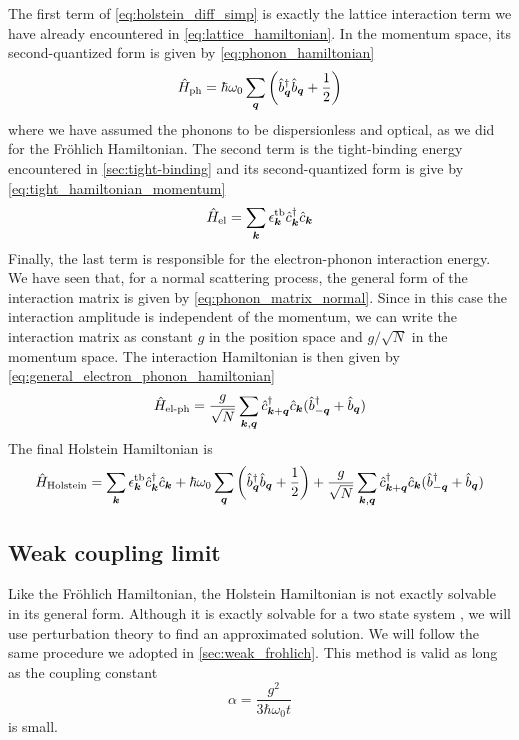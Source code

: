 The first term of \cref{eq:holstein_diff_simp} is exactly the lattice interaction term we have already encountered in \cref{eq:lattice_hamiltonian}. In the momentum space, its second-quantized form is given by \cref{eq:phonon_hamiltonian}
\begin{equation}
    \hat{H}_\text{ph} = \hbar \omega_0\sum_{\mathbf{\boldsymbol{q}}}  \left( \hat{b}^\dagger_{\mathbf{\boldsymbol{q}}} \hat{b}_{\mathbf{\boldsymbol{q}}} + \frac{1}{2} \right)
\end{equation}
where we have assumed the phonons to be dispersionless and optical, as we did for the Fröhlich Hamiltonian. The second term is the tight-binding energy encountered in \cref{sec:tight-binding} and its second-quantized form is give by \cref{eq:tight_hamiltonian_momentum}
\begin{equation}
    \hat{H}_\text{el} = \sum_{\mathbf{\boldsymbol{k}}} \epsilon_{\mathbf{\boldsymbol{k}}}^\text{tb} \hat{c}^\dagger_{\mathbf{\boldsymbol{k}}}\hat{c}_{\mathbf{\boldsymbol{k}}}
\end{equation}
Finally, the last term is responsible for the electron-phonon interaction energy. We have seen that, for a normal scattering process, the general form of the interaction matrix is given by \cref{eq:phonon_matrix_normal}. Since in this case the interaction amplitude is independent of the momentum, we can write the interaction matrix as constant $g$ in the position space and $g / \sqrt{N}$ in the momentum space. The interaction Hamiltonian is then given by \cref{eq:general_electron_phonon_hamiltonian}
\begin{equation}
    \hat{H}_\text{el-ph} = \frac{g}{\sqrt{N}}\sum_{\mathbf{\boldsymbol{k}}, \mathbf{\boldsymbol{q}}} \hat{c}^\dagger_{\mathbf{\boldsymbol{k}}+\mathbf{\boldsymbol{q}}} \hat{c}_{\mathbf{\boldsymbol{k}}} (\hat{b}^\dagger_{-\mathbf{\boldsymbol{q}}} + \hat{b}_{\mathbf{\boldsymbol{q}}})
\end{equation}
The final Holstein Hamiltonian is
\begin{equation}
    \hat{H}_\text{Holstein} = \sum_{\mathbf{\boldsymbol{k}}} \epsilon_{\mathbf{\boldsymbol{k}}}^\text{tb} \hat{c}^\dagger_{\mathbf{\boldsymbol{k}}}\hat{c}_{\mathbf{\boldsymbol{k}}} + \hbar \omega_0\sum_{\mathbf{\boldsymbol{q}}}  \left( \hat{b}^\dagger_{\mathbf{\boldsymbol{q}}} \hat{b}_{\mathbf{\boldsymbol{q}}} + \frac{1}{2} \right) + \frac{g}{\sqrt{N}}\sum_{\mathbf{\boldsymbol{k}}, \mathbf{\boldsymbol{q}}} \hat{c}^\dagger_{\mathbf{\boldsymbol{k}}+\mathbf{\boldsymbol{q}}} \hat{c}_{\mathbf{\boldsymbol{k}}} (\hat{b}^\dagger_{-\mathbf{\boldsymbol{q}}} + \hat{b}_{\mathbf{\boldsymbol{q}}})
\end{equation}

\subsection{Weak coupling limit}
Like the Fröhlich Hamiltonian, the Holstein Hamiltonian is not exactly solvable in its general form. Although it is exactly solvable for a two state system \cite{tayebi2016}, we will use perturbation theory to find an approximated solution. We will follow the same procedure we adopted in \cref{sec:weak_frohlich}. This method is valid as long as the coupling constant
\begin{equation}
    \alpha = \frac{g^2}{3\hbar\omega_0t}
\end{equation}
is small.

